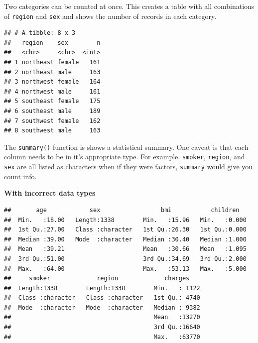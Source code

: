 \documentclass[openany]{book}
\newenvironment{Shaded}{\begin{snugshade}}{\end{snugshade}}
\newcommand{\KeywordTok}[1]{\textcolor[rgb]{0.13,0.29,0.53}{\textbf{#1}}}
\newcommand{\NormalTok}[1]{#1}
\newcommand{\OperatorTok}[1]{\textcolor[rgb]{0.81,0.36,0.00}{\textbf{#1}}}
\newcommand{\StringTok}[1]{\textcolor[rgb]{0.31,0.60,0.02}{#1}}
\begin{document}
Two categories can be counted at once. This creates a table with all combinations of \texttt{region} and \texttt{sex} and shows the number of records in each category.

\begin{Shaded}
\end{Shaded}

\begin{verbatim}
## # A tibble: 8 x 3
##   region    sex        n
##   <chr>     <chr>  <int>
## 1 northeast female   161
## 2 northeast male     163
## 3 northwest female   164
## 4 northwest male     161
## 5 southeast female   175
## 6 southeast male     189
## 7 southwest female   162
## 8 southwest male     163
\end{verbatim}

The \texttt{summary()} function is shows a statistical summary. One caveat is that each column needs to be in it's appropriate type. For example, \texttt{smoker}, \texttt{region}, and \texttt{sex} are all listed as characters when if they were factors, \texttt{summary} would give you count info.

\textbf{With incorrect data types}

\begin{Shaded}
\end{Shaded}

\begin{verbatim}
##       age            sex                 bmi           children    
##  Min.   :18.00   Length:1338        Min.   :15.96   Min.   :0.000  
##  1st Qu.:27.00   Class :character   1st Qu.:26.30   1st Qu.:0.000  
##  Median :39.00   Mode  :character   Median :30.40   Median :1.000  
##  Mean   :39.21                      Mean   :30.66   Mean   :1.095  
##  3rd Qu.:51.00                      3rd Qu.:34.69   3rd Qu.:2.000  
##  Max.   :64.00                      Max.   :53.13   Max.   :5.000  
##     smoker             region             charges     
##  Length:1338        Length:1338        Min.   : 1122  
##  Class :character   Class :character   1st Qu.: 4740  
##  Mode  :character   Mode  :character   Median : 9382  
##                                        Mean   :13270  
##                                        3rd Qu.:16640  
##                                        Max.   :63770
\end{verbatim}
\end{document}
